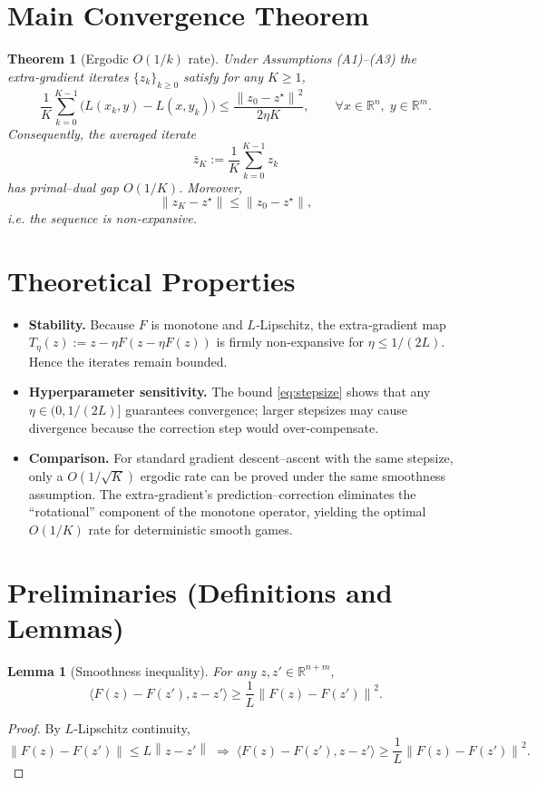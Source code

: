 \documentclass{article}
\newtheorem{theorem}{Theorem}
\newtheorem{lemma}{Lemma}
\newcommand{\R}{\mathbb{R}}
\newcommand{\norm}[1]{\left\lVert #1 \right\rVert}
\newcommand{\ip}[2]{\langle #1,#2\rangle}
\begin{document}
\section*{Main Convergence Theorem}
\begin{theorem}[Ergodic $O(1/k)$ rate]\label{thm:main}
Under Assumptions (A1)–(A3) the extra‑gradient iterates $\{z_k\}_{k\ge0}$ satisfy for any $K\ge1$,
\[
\frac{1}{K}\sum_{k=0}^{K-1}\bigl(L(x_k,y)-L(x,y_k)\bigr)
\le \frac{\norm{z_0-z^\star}^{2}}{2\eta K},
\qquad\forall x\in\R^{n},\;y\in\R^{m}.
\]
Consequently, the averaged iterate
\[
\bar z_K:=\frac1K\sum_{k=0}^{K-1}z_k
\]
has primal–dual gap $O(1/K)$. Moreover,
\[
\norm{z_{K}-z^\star}\le \norm{z_0-z^\star},
\]
i.e. the sequence is non‑expansive.
\end{theorem}

\section*{Theoretical Properties}
\begin{itemize}
\item \textbf{Stability.} Because $F$ is monotone and $L$‑Lipschitz, the extra‑gradient map $T_{\eta}(z):=z-\eta F(z-\eta F(z))$ is firmly non‑expansive for $\eta\le 1/(2L)$. Hence the iterates remain bounded.
\item \textbf{Hyperparameter sensitivity.} The bound \eqref{eq:stepsize} shows that any $\eta\in(0,1/(2L)]$ guarantees convergence; larger stepsizes may cause divergence because the correction step would over‑compensate.
\item \textbf{Comparison.} For standard gradient descent–ascent with the same stepsize, only a $O(1/\sqrt{K})$ ergodic rate can be proved under the same smoothness assumption. The extra‑gradient’s prediction–correction eliminates the “rotational” component of the monotone operator, yielding the optimal $O(1/K)$ rate for deterministic smooth games.
\end{itemize}

\section*{Preliminaries (Definitions and Lemmas)}
\begin{lemma}[Smoothness inequality]\label{lem:smooth}
For any $z,z'\in\R^{n+m}$,
\[
\ip{F(z)-F(z')}{z-z'}\ge \frac{1}{L}\norm{F(z)-F(z')}^{2}.
\tag{L1}
\]
\end{lemma}
\begin{proof}
By $L$‑Lipschitz continuity,
\[
\norm{F(z)-F(z')}\le L\norm{z-z'}\;\Longrightarrow\;
\ip{F(z)-F(z')}{z-z'}\ge \frac{1}{L}\norm{F(z)-F(z')}^{2}.
\]
\end{proof}
\end{document}
